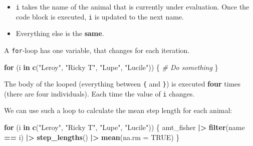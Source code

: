 \documentclass[ignorenonframetext,,t]{beamer}
\let\oldtextbf\textbf
\renewcommand{\textbf}[1]{\textcolor{spamwell}{\oldtextbf{#1}}}
\providecommand{\tightlist}{%
\setlength{\itemsep}{0pt}\setlength{\parskip}{0pt}}
\newenvironment{Shaded}{\begin{snugshade}}{\end{snugshade}}
\newcommand{\AttributeTok}[1]{\textcolor[rgb]{0.13,0.29,0.53}{#1}}
\newcommand{\CommentTok}[1]{\textcolor[rgb]{0.56,0.35,0.01}{\textit{#1}}}
\newcommand{\ConstantTok}[1]{\textcolor[rgb]{0.56,0.35,0.01}{#1}}
\newcommand{\ControlFlowTok}[1]{\textcolor[rgb]{0.13,0.29,0.53}{\textbf{#1}}}
\newcommand{\FunctionTok}[1]{\textcolor[rgb]{0.13,0.29,0.53}{\textbf{#1}}}
\newcommand{\NormalTok}[1]{#1}
\newcommand{\SpecialCharTok}[1]{\textcolor[rgb]{0.81,0.36,0.00}{\textbf{#1}}}
\newcommand{\StringTok}[1]{\textcolor[rgb]{0.31,0.60,0.02}{#1}}
\providecommand{\tightlist}{%
\setlength{\itemsep}{0pt}\setlength{\parskip}{0pt}}
\renewcommand{\tightlist}{\setlength{\itemsep}{1.4ex}\setlength{\parskip}{0pt}}
\begin{document}
\begin{frame}[fragile]
\begin{itemize}
\tightlist
\item
  \texttt{i} takes the name of the animal that is currently under
  evaluation. Once the code block is executed, \texttt{i} is updated to
  the next name.
\item
  Everything else is the \textbf{same}.
\end{itemize}

A \texttt{for}-loop has one variable, that changes for each iteration.

\begin{Shaded}
\begin{Highlighting}[]
\ControlFlowTok{for}\NormalTok{ (i }\ControlFlowTok{in} \FunctionTok{c}\NormalTok{(}\StringTok{"Leroy"}\NormalTok{, }\StringTok{"Ricky T"}\NormalTok{, }\StringTok{"Lupe"}\NormalTok{, }\StringTok{"Lucile"}\NormalTok{)) \{}
  \CommentTok{\# Do something}
\NormalTok{\}}
\end{Highlighting}
\end{Shaded}

The body of the looped (everything between \texttt{\{} and \texttt{\}})
is executed \textbf{four} times (there are four individuals). Each time
the value of \texttt{i} changes.
\end{frame}

\begin{frame}[fragile]
We can use such a loop to calculate the mean step length for each
animal:

\begin{Shaded}
\begin{Highlighting}[]
\ControlFlowTok{for}\NormalTok{ (i }\ControlFlowTok{in} \FunctionTok{c}\NormalTok{(}\StringTok{"Leroy"}\NormalTok{, }\StringTok{"Ricky T"}\NormalTok{, }\StringTok{"Lupe"}\NormalTok{, }\StringTok{"Lucile"}\NormalTok{)) \{}
\NormalTok{  amt\_fisher }\SpecialCharTok{|\textgreater{}} \FunctionTok{filter}\NormalTok{(name }\SpecialCharTok{==}\NormalTok{ i) }\SpecialCharTok{|\textgreater{}} 
    \FunctionTok{step\_lengths}\NormalTok{() }\SpecialCharTok{|\textgreater{}} \FunctionTok{mean}\NormalTok{(}\AttributeTok{na.rm =} \ConstantTok{TRUE}\NormalTok{)}
\NormalTok{\}}
\end{Highlighting}
\end{Shaded}
\end{frame}
\end{document}
